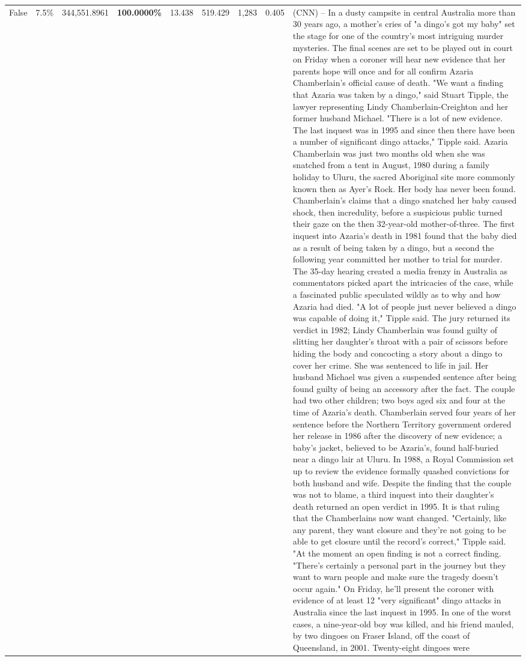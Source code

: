 \begin{table}[H]
\begin{tabular}{lllrlllll}
False & 7.5\% & 344,551.8961 & \bfseries \color{red} 100.0000\% & 13.438 & 519.429 & 1,283 & 0.405 & (CNN) -- In a dusty campsite in central Australia more than 30 years ago, a mother's cries of "a dingo's got my baby" set the stage for one of the country's most intriguing murder mysteries. The final scenes are set to be played out in court on Friday when a coroner will hear new evidence that her parents hope will once and for all confirm Azaria Chamberlain's official cause of death. "We want a finding that Azaria was taken by a dingo," said Stuart Tipple, the lawyer representing Lindy Chamberlain-Creighton and her former husband Michael. "There is a lot of new evidence. The last inquest was in 1995 and since then there have been a number of significant dingo attacks," Tipple said. Azaria Chamberlain was just two months old when she was snatched from a tent in August, 1980 during a family holiday to Uluru, the sacred Aboriginal site more commonly known then as Ayer's Rock. Her body has never been found. Chamberlain's claims that a dingo snatched her baby caused shock, then incredulity, before a suspicious public turned their gaze on the then 32-year-old mother-of-three. The first inquest into Azaria's death in 1981 found that the baby died as a result of being taken by a dingo, but a second the following year committed her mother to trial for murder. The 35-day hearing created a media frenzy in Australia as commentators picked apart the intricacies of the case, while a fascinated public speculated wildly as to why and how Azaria had died. "A lot of people just never believed a dingo was capable of doing it," Tipple said. The jury returned its verdict in 1982; Lindy Chamberlain was found guilty of slitting her daughter's throat with a pair of scissors before hiding the body and concocting a story about a dingo to cover her crime. She was sentenced to life in jail. Her husband Michael was given a suspended sentence after being found guilty of being an accessory after the fact. The couple had two other children; two boys aged six and four at the time of Azaria's death. Chamberlain served four years of her sentence before the Northern Territory government ordered her release in 1986 after the discovery of new evidence; a baby's jacket, believed to be Azaria's, found half-buried near a dingo lair at Uluru. In 1988, a Royal Commission set up to review the evidence formally quashed convictions for both husband and wife. Despite the finding that the couple was not to blame, a third inquest into their daughter's death returned an open verdict in 1995. It is that ruling that the Chamberlains now want changed. "Certainly, like any parent, they want closure and they're not going to be able to get closure until the record's correct," Tipple said. "At the moment an open finding is not a correct finding. "There's certainly a personal part in the journey but they want to warn people and make sure the tragedy doesn't occur again." On Friday, he'll present the coroner with evidence of at least 12 "very significant" dingo attacks in Australia since the last inquest in 1995. In one of the worst cases, a nine-year-old boy was killed, and his friend mauled, by two dingoes on Fraser Island, off the coast of Queensland, in 2001. Twenty-eight dingoes were 
\end{tabular}
\end{table}

